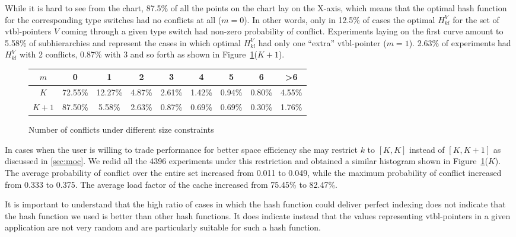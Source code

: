 While it is hard to see from the chart, 87.5\% of all the points on the chart 
lay on the X-axis, which means that the optimal hash function for the 
corresponding type switches had no conflicts at all ($m=0$). In other words, only in 12.5\% 
of cases the optimal $H_{kl}^V$ for the set of vtbl-pointers $V$ coming through 
a given type switch had non-zero probability of conflict. Experiments laying on 
the first curve amount to 5.58\% of subhierarchies and represent the cases in 
which optimal $H_{kl}^V$ had only one ``extra'' vtbl-pointer ($m=1$). 2.63\% of 
experiments had $H_{kl}^V$ with 2 conflicts, 0.87\% with 3 and so forth as shown 
in Figure~\ref{fig:size}($K+1$).

\begin{figure}[htbp]
\begin{tabular}
{@{}c@{}||@{}c@{}|@{}c@{}|@{}c@{}|@{}c@{}|@{}c@{}|@{}c@{}|@{}c@{}|@{}c@{}}
\hline %
  $m$ &       0 &       1 &      2 &      3 &      4 &        5 &      6 & \textgreater 6 \\
\hline %
  $K$ & 72.55\% & 12.27\% & 4.87\% & 2.61\% & 1.42\% & 0.94\% & 0.80\% & 4.55\% \\
\hline %
$K+1$ & 87.50\% &  5.58\% & 2.63\% & 0.87\% & 0.69\% & 0.69\% & 0.30\% & 1.76\% 
\end{tabular}
\caption{Number of conflicts under different size constraints}
\label{fig:size}
\end{figure}

\noindent
In cases when the user is willing to trade performance for better space 
efficiency she may restrict $k$ to $[K,K]$ instead of $[K,K+1]$ as discussed in 
\textsection\ref{sec:moc}. We redid all the 4396 experiments under this 
restriction and obtained a similar histogram shown in Figure~\ref{fig:size}($K$).
The average probability of conflict over the entire set increased from 0.011 to 
0.049, while the maximum probability of conflict increased from 0.333 to 0.375. 
The average load factor of the cache increased from 75.45\% to 82.47\%. 

It is important to understand that the high ratio of cases in which the hash 
function could deliver perfect indexing does not indicate that the hash function 
we used is better than other hash functions. It does indicate instead that the 
values representing vtbl-pointers in a given application are not very random and 
are particularly suitable for such a hash function.

